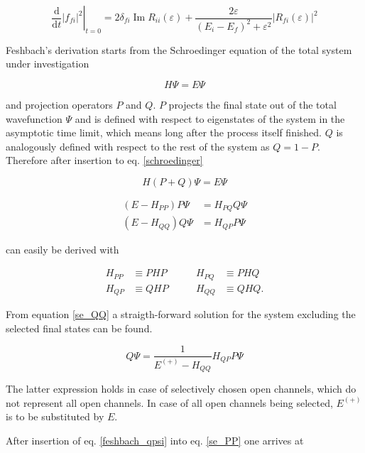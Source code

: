 \begin{equation}
  \left . \frac{\mathrm{d}}{\mathrm{d}t} |f_{fi}|^2 \right |_{t=0}
  = 2\delta_{fi} \operatorname{Im}R_{ii}(\varepsilon) 
    + \frac{2\varepsilon}{(E_i-E_f)^2+\varepsilon^2} |R_{fi}(\varepsilon)|^2
\end{equation}


Feshbach's derivation starts from the Schroedinger equation of the total
system under investigation

\begin{equation}
  H \Psi = E \Psi \label{schroedinger}
\end{equation}

and projection operators $P$ and $Q$. $P$ projects the final state out
of the total wavefunction $\Psi$ and is defined with respect to eigenstates
of the system in the asymptotic time limit, which means long after the process
itself finished. $Q$ is analogously defined with respect to the rest of the
system as $Q = 1 - P$. Therefore after insertion to eq. \ref{schroedinger}

\begin{equation}
  H (P+Q) \Psi = E \Psi
\end{equation}

\begin{align}
  (E - H_{PP}) P \Psi & = H_{PQ} Q \Psi \label{se_PP}\\
  (E - H_{QQ}) Q \Psi & = H_{QP} P \Psi \label{se_QQ}
\end{align}

can easily be derived with

\begin{align*}
  H_{PP} & \equiv PHP & \quad\quad H_{PQ} & \equiv PHQ\\
  H_{QP} & \equiv QHP & \quad\quad H_{QQ} & \equiv QHQ .
\end{align*}

From equation \ref{se_QQ} a straigth-forward solution for the system excluding
the selected final states can be found.

\begin{equation}
  Q \Psi = \frac{1}{E^{(+)}-H_{QQ}} H_{QP} P \Psi \label{feshbach_qpsi}
\end{equation}

The latter expression holds in case of selectively chosen open channels, which
do not represent all open channels. In case of all open channels being selected,
$E^{(+)}$ is to be substituted by $E$.

After insertion of eq. \ref{feshbach_qpsi} into eq. \ref{se_PP} one arrives at


